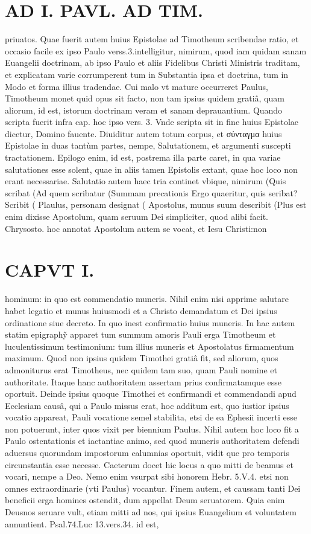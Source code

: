 \documentclass{article}
\begin{document}
\begin{pages}
\section*{AD I. PAVL. AD TIM. }
\marginpar{[ p.2 ]}\pstart priuatos. Quae fuerit autem huius Epistolae ad Timotheum scribendae ratio, et occasio facile ex ipso Paulo verss.3.intelligitur, nimirum, quod iam quidam sanam Euangelii doctrinam, ab ipso Paulo et aliis Fidelibus Christi Ministris traditam, et explicatam varie corrumperent tum in Substantia ipsa et doctrina, tum in Modo et forma illius tradendae. Cui malo vt mature occurreret Paulus, Timotheum monet quid opus sit facto, non tam ipsius quidem gratiâ, quam aliorum, id est, istorum doctrinam veram et sanam deprauantium. Quando scripta fuerit infra cap. hoc ipso vers. 3. Vnde scripta sit in fine huius Epistolae dicetur, Domino fauente. Diuiditur autem totum corpus, et σύνταγμα huius Epistolae in duas tantùm partes, nempe, Salutationem, et argumenti suscepti tractationem. Epilogo enim, id est, postrema illa parte caret, in qua variae salutationes esse solent, quae in aliis tamen Epistolis extant, quae hoc loco non erant necessariae. Salutatio autem haec tria continet vbique, nimirum (Quis scribat (Ad quem scribatur (Summam precationis Ergo quaeritur, quis seribat? Scribit ( Plaulus, personam designat ( Apostolus, munus suum describit (Plus est enim dixisse Apostolum, quam seruum Dei simpliciter, quod alibi facit. Chrysosto. hoc annotat Apostolum autem se vocat, et Iesu Christi:non  \pend
\section*{CAPVT  I. }
\marginpar{[ p.3 ]}\pstart hominum: in quo est commendatio muneris. Nihil enim nisi apprime salutare habet legatio et munus huiusmodi et a Christo demandatum et Dei ipsius ordinatione siue decreto. In quo inest confirmatio huius muneris. In hac autem statim epigraphỹ apparet tum summum amoris Pauli erga Timotheum et luculentissimum testimonium: tum illius muneris et Apostolatus firmamentum maximum. Quod non ipsius quidem Timothei gratiâ fit, sed aliorum, quos admoniturus erat Timotheus, nec quidem tam suo, quam Pauli nomine et authoritate. Itaque hanc authoritatem assertam prius confirmatamque esse oportuit. Deinde ipsius quoque Timothei et confirmandi et commendandi apud Ecclesiam causâ, qui a Paulo missus erat, hoc additum est, quo iustior ipsius vocatio appareat, Pauli vocatione semel stabilita, etsi de ea Ephesii incerti esse non potuerunt, inter quos vixit per biennium Paulus. Nihil autem hoc loco fit a Paulo ostentationis et iactantiae animo, sed quod muneris authoritatem defendi aduersus quorundam impostorum calumnias oportuit, vidit que pro temporis circunstantia esse necesse. Caeterum docet hic locus a quo mitti de beamus et vocari, nempe a Deo. Nemo enim vsurpat sibi honorem Hebr. 5.V.4. etsi non omnes extraordinarie (vti Paulus) vocantur. Finem autem, et caussam tanti Dei beneficii erga homines ostendit, dum appellat Deum seruatorem. Quia enim Deusnos seruare vult, etiam mitti ad nos, qui ipsius Euangelium et voluntatem annuntient. Psal.74.Luc 13.vers.34. id est,  \pend

\end{pages}
\end{document}
